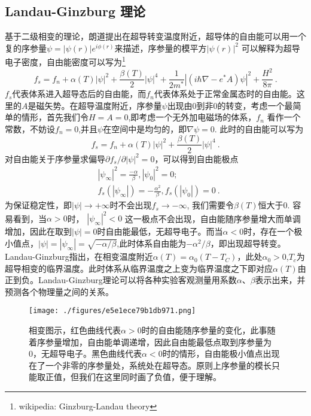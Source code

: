 \subsection{Landau-Ginzburg 理论}
基于二级相变的理论，朗道提出在超导转变温度附近，超导体的自由能可以用一个复的序参量$\psi = |\psi(r)|e^{i\phi(r)}$来描述，序参量的模平方$|\psi(r)|^2$ 可以解释为超导电子密度，自由能密度可以写为\footnote{wikipedia: Ginzburg-Landau theory}
\begin{equation}
f_s = f_n + \alpha(T) |\psi|^2 + \frac{\beta(T)}{2} |\psi|^4 + \frac{1}{2m^*} \left| \left(i\hbar \nabla - e^* A \right)\psi \right|^2 + \frac{H^2}{8\pi} \label{eq_gl_1}~.
\end{equation}
$f_s$代表体系进入超导态后的自由能，而$f_n$代表体系处于正常金属态时的自由能。这里的$A$是磁矢势。在超导温度附近，序参量$\psi$出现由0到非0的转变，考虑一个最简单的情形，首先我们令$H=A = 0$,即考虑一个无外加电磁场的体系，$f_n$ 看作一个常数，不妨设$f_n=0$,并且$\psi$在空间中是均匀的，即$\nabla \psi = 0$. 此时的自由能可以写为
\begin{equation}
f_s = f_n + \alpha(T) |\psi|^2 + \frac{\beta(T)}{2} |\psi|^4 ~.
\end{equation}
对自由能关于序参量求偏导$\partial f_s /\partial |\psi|^2 = 0$，可以得到自由能极点
\begin{align}
&|\psi_{\infty}|^2 = \frac{-\alpha}{\beta},|\psi_0|^2 = 0;\\
&f_s(|\psi_{\infty}|) = -\frac{\alpha^2}{\beta}, f_s(|\psi_0|) = 0 ~.
\end{align}
为保证稳定性，即$|\psi|\rightarrow +\infty$时不会出现$f_s \rightarrow -\infty$, 我们需要令$\beta(T)$恒大于0. 容易看到，当$\alpha>0$时， $|\psi_\infty|^2 <0$ 这一极点不会出现，自由能随序参量增大而单调增加，因此在取到$|\psi|=0$时自由能最低，无超导电子。而当$\alpha<0$时，存在一个极小值点，$|\psi| = |\psi_{\infty}| = \sqrt{-\alpha/\beta}$,此时体系自由能为$-\alpha^2/\beta$，即出现超导转变。Landau-Ginzburg指出，在相变温度附近$\alpha(T) = \alpha_0 (T - T_C)$，此处$\alpha_0 > 0$,$T_c$为超导相变的临界温度。此时体系从临界温度之上变为临界温度之下即对应$\alpha(T)$由正到负。Landau-Ginzburg理论可以将各种实验客观测量用系数$\alpha$、$\beta$表示出来，并预测各个物理量之间的关系。
\begin{figure}[ht]
\centering
\texttt{[image: ./figures/e5e1ece79b1db971.png]}
\caption{相变图示，红色曲线代表$\alpha>0$时的自由能随序参量的变化，此事随着序参量增加，自由能单调递增，因此自由能最低点取到序参量为0，无超导电子。黑色曲线代表$\alpha<0$时的情形，自由能极小值点出现在了一个非零的序参量处，系统处在超导态。原则上序参量的模长只能取正值，但我们在这里同时画了负值，便于理解。} \label{fig_LanGin_1}
\end{figure}
